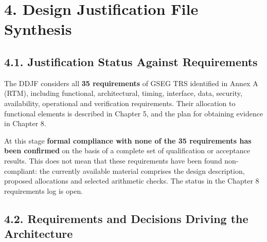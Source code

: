 \section{4. Design Justification File Synthesis}\label{ddjf-4}

\subsection{4.1. Justification Status Against Requirements}\label{ddjf-4-1}

The DDJF considers all \textbf{35 requirements} of GSEG TRS identified in Annex A (RTM), including functional, architectural, timing, interface, data, security, availability, operational and verification requirements. Their allocation to functional elements is described in Chapter 5, and the plan for obtaining evidence in Chapter 8.

At this stage \textbf{formal compliance with none of the 35 requirements has been confirmed} on the basis of a complete set of qualification or acceptance results. This does not mean that these requirements have been found non-compliant: the currently available material comprises the design description, proposed allocations and selected arithmetic checks. The status in the Chapter 8 requirements log is open.

\subsection{4.2. Requirements and Decisions Driving the Architecture}\label{ddjf-4-2}


